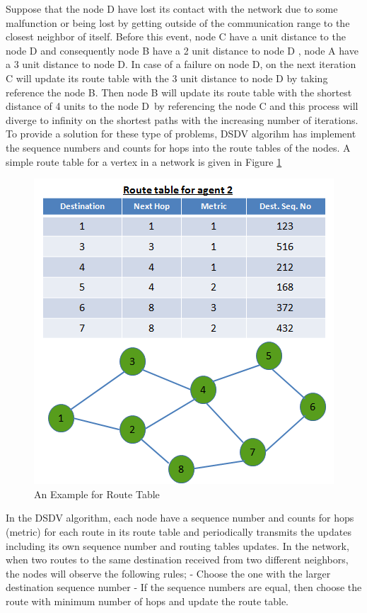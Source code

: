 Suppose that the node D have lost its contact with the network due to some malfunction or being lost by getting outside of the communication range to the closest neighbor of itself. Before this event, node C have a unit distance to the node D and consequently node B have a 2 unit distance to node D , node A have a 3 unit distance to node D. In case of a failure on node D, on the next iteration C will update its route table with the 3 unit distance to node D by taking reference the node B. Then node B will update its route table with the shortest distance of 4 units to the node D\ by referencing the node C and this process will diverge to infinity on the shortest paths with the increasing number of iterations. To provide a solution for these type of problems, DSDV algorihm has implement the sequence numbers and counts for hops into the route tables of the nodes. A simple route table for a vertex in a network is given in Figure \ref{dest_seq_ref}

\begin{figure}[H]
\caption{An Example for Route Table} \label{dest_seq_ref}
\centering
\includegraphics[scale = 0.65]{dest_seq}
\end{figure}

In the DSDV algorithm, each node have a sequence number and counts for hops (metric) for each route in its route table and periodically transmits the updates including its own sequence number and routing tables updates. In the network, when two routes to the same destination received from two different neighbors, the nodes will observe the following rules;\newline
	- Choose the one with the larger destination sequence number \newline
	- If the sequence numbers are equal, then choose the route with minimum number of hops and update the route table.
	

